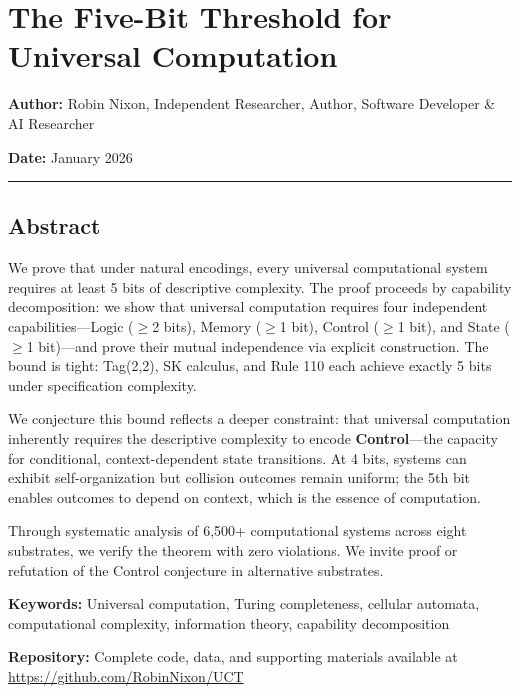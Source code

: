 \documentclass[
  11pt,
]{article}
\author{}
\date{}
\begin{document}
\hypertarget{the-five-bit-threshold-for-universal-computation}{%
\section{The Five-Bit Threshold for Universal
Computation}\label{the-five-bit-threshold-for-universal-computation}}

\textbf{Author:} Robin Nixon, Independent Researcher, Author, Software Developer \& AI Researcher

\textbf{Date:} January 2026

\begin{center}\rule{0.5\linewidth}{0.5pt}\end{center}

\hypertarget{abstract}{%
\subsection{Abstract}\label{abstract}}

We prove that under natural encodings, every universal computational
system requires at least 5 bits of descriptive complexity. The proof
proceeds by capability decomposition: we show that universal computation
requires four independent capabilities---Logic ($\geq$2 bits), Memory ($\geq$1
bit), Control ($\geq$1 bit), and State ($\geq$1 bit)---and prove their mutual
independence via explicit construction. The bound is tight: Tag(2,2), SK
calculus, and Rule 110 each achieve exactly 5 bits under specification
complexity.

We conjecture this bound reflects a deeper constraint: that universal
computation inherently requires the descriptive complexity to encode
\textbf{Control}---the capacity for conditional, context-dependent state
transitions. At 4 bits, systems can exhibit self-organization but
collision outcomes remain uniform; the 5th bit enables outcomes to
depend on context, which is the essence of computation.

Through systematic analysis of 6,500+ computational systems across eight
substrates, we verify the theorem with zero violations. We invite proof
or refutation of the Control conjecture in alternative substrates.

\textbf{Keywords:} Universal computation, Turing completeness, cellular
automata, computational complexity, information theory, capability
decomposition

\textbf{Repository:} Complete code, data, and supporting materials available at \url{https://github.com/RobinNixon/UCT}
\end{document}
